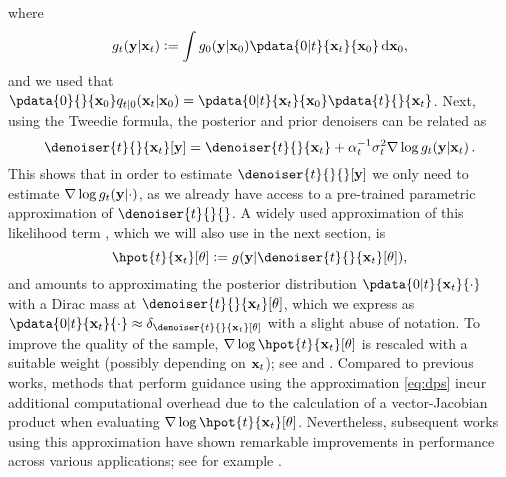 where 
\begin{equation}
    \label{eq:pot-defn}
    \pot{t}{\bx_t} \eqdef \int \pot{0}{\bx_0} \pdata{0|t}{\bx_t}{\bx_0} \, \rmd \bx_0, 
\end{equation} and we used that $\pdata{0}{}{\bx_0} \fw{t|0}{\bx_0}{\bx_t} =  \pdata{0|t}{\bx_t}{\bx_0} \pdata{t}{}{\bx_t}$.
Next, using the Tweedie formula, the posterior and prior denoisers can be related as 
\begin{equation} 
    \label{eq:posterior-denoiser}
    \denoiser{t}{}{\bx_t}[\obs] = \denoiser{t}{}{\bx_t} + \a^{-1} _t \std^2 _t \nabla \log \pot{t}{\bx_t} \eqsp. 
\end{equation}
This shows that in order to estimate $\denoiser{t}{}{}[\obs]$ we only need to estimate $\nabla \log \pot{t}{}$, as we already have access to a pre-trained parametric approximation of $\denoiser{t}{}{}$. A widely used approximation of this likelihood term \cite{ho2022video, chung2023diffusion}, which we will also use in the next section, is 
\begin{equation}
    \label{eq:dps}
    \hpot{t}{\bx_t}[\param] \eqdef \pot{}{\denoiser{t}{}{\bx_t}[\param]}, 
\end{equation} 
and amounts to approximating the posterior distribution $\pdata{0|t}{\bx_t}{\cdot}$ with a Dirac mass at $\denoiser{t}{}{\bx_t}[\theta]$, which we express as $\pdata{0|t}{\bx_t}{\cdot} \approx \delta_{\denoiser{t}{}{\bx_t}[\theta]}$ with a slight abuse of notation. To improve the quality of the sample, $\nabla \log \hpot{t}{\bx_t}[\param]$ is rescaled with a suitable weight (possibly depending on $\mathbf{x}_t$); see \citep[Equation 8]{ho2022video} and \citep[Algorithm 1]{chung2023diffusion}. 
    Compared to previous works, methods that perform guidance using the approximation \eqref{eq:dps} incur additional computational overhead due to the calculation of a vector-Jacobian product when evaluating $\nabla \log \hpot{t}{\bx_t}[\param]$. Nevertheless, subsequent works using this approximation have shown remarkable improvements in performance across various applications; see for example \cite{song2022pseudoinverse, rozet2023score, yu2023freedom, wu2023practical,jiang2023motiondiffuser,rozet2024learning, moufad2024variational}. 

